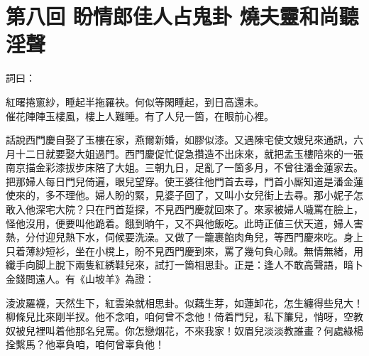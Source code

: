 
\chapter*{第八回 盼情郎佳人占鬼卦 燒夫靈和尚聽淫聲}


詞曰：

\begin{myquote} 
紅曙捲窻紗，睡起半拖羅袂。何似等閑睡起，到日高還未。\\催花陣陣玉樓風，樓上人難睡。有了人兒一箇，在眼前心裡。
\end{myquote} 

話說西門慶自娶了玉樓在家，燕爾新婚，如膠似漆。又遇陳宅使文嫂兒來通訊，六月十二日就要娶大姐過門。西門慶促忙促急攢造不出床來，就把孟玉樓陪來的一張南京描金彩漆拔步床陪了大姐。三朝九日，足亂了一箇多月，不曾往潘金蓮家去。把那婦人每日門兒倚遍，眼兒望穿。使王婆往他門首去尋，門首小厮知道是潘金蓮使來的，多不理他。婦人盼的緊，見婆子回了，又叫小女兒街上去尋。那小妮子怎敢入他深宅大院？只在門首踅探，不見西門慶就回來了。來家被婦人噦罵在臉上，怪他沒用，便要叫他跪着。餓到晌午，又不與他飯吃。此時正値三伏天道，婦人害熱，分付迎兒熱下水，伺候要洗澡。又做了一籠裹餡肉角兒，等西門慶來吃。身上只着薄紗短衫，坐在小櫈上，盼不見西門慶到來，罵了幾句負心賊。無情無緒，用纖手向脚上脫下兩隻紅綉鞋兒來，試打一箇相思卦。正是：逢人不敢高聲語，暗卜金錢問遠人。有《山坡羊》為證：

\begin{myquote} 
淩波羅襪，天然生下，紅雲染就相思卦。似藕生芽，如蓮卸花，怎生纏得些兒大！柳條兒比來剛半扠。他不念咱，咱何曾不念他！倚着門兒，私下簾兒，悄呀，空教奴被兒裡叫着他那名兒罵。你怎戀烟花，不來我家！奴眉兒淡淡教誰畫？何處綠楊拴繫馬？他辜負咱，咱何曾辜負他！
\end{myquote} 

